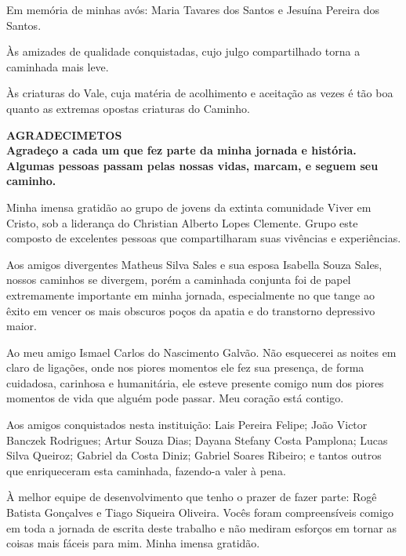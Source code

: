 \documentclass[12pt,a4paper,oneside,brazil]{abntex2}
\begin{document}
Em memória de minhas avós: Maria Tavares dos Santos e
Jesuína Pereira dos Santos.

\vspace{10mm}

Às amizades de qualidade conquistadas, cujo julgo compartilhado
torna a caminhada mais leve.

\vspace{30mm}


Às criaturas do Vale, cuja matéria de acolhimento e aceitação
as vezes é tão boa quanto as extremas opostas criaturas do Caminho.



\clearpage

\centering
\ABNTEXchapterfont\bfseries{\textsc{\MakeUppercase{Agradecimetos}}}\\
\vspace*{3cm}
\justifying
\normalfont
Agradeço a cada um que fez parte da minha jornada e história. Algumas pessoas
passam pelas nossas vidas, marcam, e seguem seu caminho.

Minha imensa gratidão ao grupo de jovens da extinta comunidade Viver em Cristo,
sob a liderança do Christian Alberto Lopes Clemente. Grupo este composto de excelentes
pessoas que compartilharam suas vivências e experiências.

Aos amigos divergentes Matheus Silva Sales e sua esposa Isabella Souza Sales,
nossos caminhos se divergem, porém a caminhada conjunta foi de papel extremamente
importante em minha jornada, especialmente no que tange ao êxito em vencer os mais
obscuros poços da apatia e do transtorno depressivo maior. 

Ao meu amigo Ismael Carlos do Nascimento Galvão.
Não esquecerei as noites em claro de ligações, onde nos piores
momentos ele fez sua presença, de forma cuidadosa, carinhosa e
humanitária, ele esteve presente comigo num dos piores momentos
de vida que alguém pode passar.
Meu coração está contigo.

Aos amigos conquistados nesta instituição: Lais Pereira Felipe;
João Victor Banczek Rodrigues;
Artur Souza Dias;
Dayana Stefany Costa Pamplona;
Lucas Silva Queiroz;
Gabriel da Costa Diniz;
Gabriel Soares Ribeiro;
e tantos outros que enriqueceram esta caminhada, fazendo-a valer
à pena.

À melhor equipe de desenvolvimento que tenho o prazer de fazer parte:
Rogê Batista Gonçalves e Tiago Siqueira Oliveira. Vocês foram compreensíveis
comigo em toda a jornada de escrita deste trabalho e não mediram esforços
em tornar as coisas mais fáceis para mim. Minha imensa gratidão.
\end{document}
